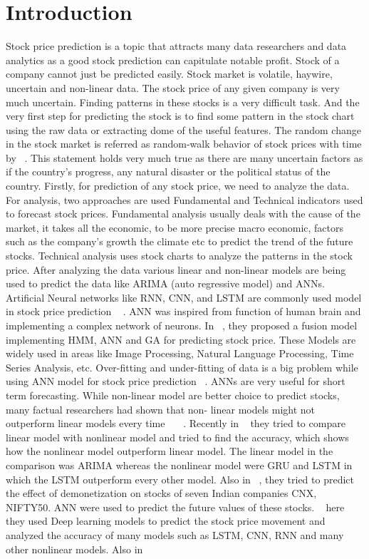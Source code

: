 \documentclass[5p,,preprint,12pt,twocolumn]{elsarticle}
\begin{document}
\section{Introduction }
Stock price prediction is a topic that attracts many data researchers and data analytics as a good stock prediction can capitulate notable profit. Stock of a company cannot just be predicted easily. Stock market is volatile, haywire, uncertain and non-linear data. The stock price of any given company is very much uncertain. Finding patterns in these stocks is a very difficult task. And the very first step for predicting the stock is to find some pattern in the stock chart using the raw data or extracting dome of the useful features. The random change in the stock market is referred as random-walk behavior of stock prices with time by \unskip~\cite{489105:11004371}. This statement holds very much true as there are many uncertain factors as if the country's progress, any natural disaster or the political status of the country. Firstly, for prediction of any stock price, we need to analyze the data. For analysis, two approaches are used Fundamental and Technical indicators used to forecast stock prices. Fundamental analysis usually deals with the cause of the market, it takes all the economic, to be more precise macro economic, factors such as the company's growth the climate etc to predict the trend of the future stocks. Technical analysis uses stock charts to analyze the patterns in the stock price. After analyzing the data various linear and non-linear models are being used to predict the data like ARIMA (auto regressive model) and ANNs. Artificial Neural networks like RNN, CNN, and LSTM are commonly used model in stock price prediction \unskip~\cite{489105:11003463} . ANN was inspired from function of human brain and implementing a complex network of neurons.  In \unskip~\cite{489105:11003464}, they proposed a fusion model implementing HMM, ANN and GA for predicting stock price. These Models are widely used in areas like Image Processing, Natural Language Processing, Time Series Analysis, etc. Over-fitting and under-fitting of data is a big problem while using ANN model for stock price prediction \unskip~\cite{489105:11003465}. ANNs are very useful for short term forecasting. While non-linear model are better choice to predict stocks, many factual researchers had shown that non- linear models might not outperform linear models every time \unskip~\cite{489105:11003466}\unskip~\cite{489105:11003467}\unskip~\cite{489105:11003509}. Recently in \unskip~\cite{489105:11003657} they tried to compare linear model with nonlinear model and tried to find the accuracy, which shows how the nonlinear model outperform linear model. The linear model in the comparison was ARIMA whereas the nonlinear model were GRU and LSTM in which the LSTM outperform every other model. Also in \unskip~\cite{489105:11003565}, they tried to predict the effect of demonetization on stocks of seven Indian companies CNX, NIFTY50. ANN were used to predict the future values of these stocks. \unskip~\cite{489105:11003566} here they used Deep learning models to predict the stock price movement and analyzed the accuracy of many models such as LSTM, CNN, RNN and many other nonlinear models. Also in \unskip~\cite{489105:11003608} 
\end{document}
